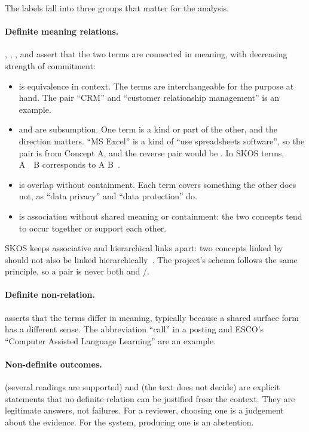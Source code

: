 The labels fall into three groups that matter for the analysis.

\paragraph{Definite meaning relations.} \SC, \PA, \CH, \PO{} and \RE{} assert that the two terms are connected in meaning, with decreasing strength of commitment:
\begin{itemize}
    \item \SC{} is equivalence in context. The terms are interchangeable for the purpose at hand. The pair ``CRM'' and ``customer relationship management'' is an example.
    \item \PA{} and \CH{} are subsumption. One term is a kind or part of the other, and the direction matters. ``MS Excel'' is a kind of ``use spreadsheets software'', so the pair is \CH{} from Concept A, and the reverse pair would be \PA. In SKOS terms, A~\CH~B corresponds to A  B~\cite{miles2009skos}.
    \item \PO{} is overlap without containment. Each term covers something the other does not, as ``data privacy'' and ``data protection'' do.
    \item \RE{} is association without shared meaning or containment: the two concepts tend to occur together or support each other.
\end{itemize}
SKOS keeps associative and hierarchical links apart: two concepts linked by  should not also be linked hierarchically~\cite{miles2009skos}. The project's schema follows the same principle, so a pair is never both \RE{} and \PA/\CH.

\paragraph{Definite non-relation.} \UN{} asserts that the terms differ in meaning, typically because a shared surface form has a different sense. The abbreviation ``call'' in a posting and ESCO's ``Computer Assisted Language Learning'' are an example.

\paragraph{Non-definite outcomes.} \AM{} (several readings are supported) and \IE{} (the text does not decide) are explicit statements that no definite relation can be justified from the context. They are legitimate answers, not failures. For a reviewer, choosing one is a judgement about the evidence. For the system, producing one is an abstention.

